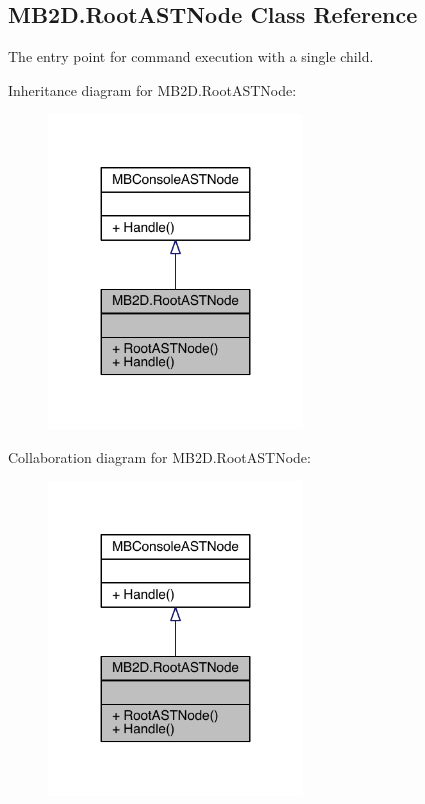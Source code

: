 \hypertarget{class_m_b2_d_1_1_root_a_s_t_node}{}\subsection{M\+B2\+D.\+Root\+A\+S\+T\+Node Class Reference}
\label{class_m_b2_d_1_1_root_a_s_t_node}


The entry point for command execution with a single child.  




Inheritance diagram for M\+B2\+D.\+Root\+A\+S\+T\+Node\+:
\nopagebreak
\begin{figure}[H]
\begin{center}
\leavevmode
\includegraphics[width=191pt]{class_m_b2_d_1_1_root_a_s_t_node__inherit__graph}
\end{center}
\end{figure}


Collaboration diagram for M\+B2\+D.\+Root\+A\+S\+T\+Node\+:
\nopagebreak
\begin{figure}[H]
\begin{center}
\leavevmode
\includegraphics[width=191pt]{class_m_b2_d_1_1_root_a_s_t_node__coll__graph}
\end{center}
\end{figure}
